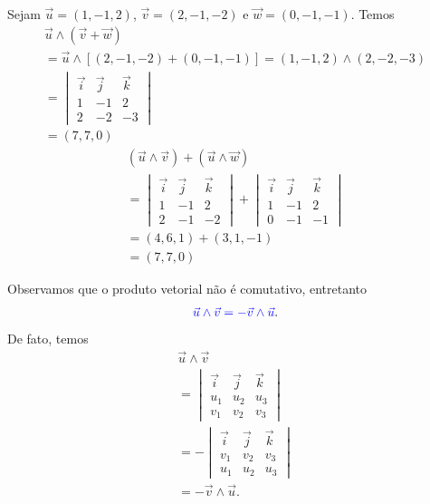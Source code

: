 \begin{ex}
  Sejam $\vec{u}=(1,-1,2)$, $\vec{v}=(2,-1,-2)$ e $\vec{w}=(0,-1,-1)$. Temos
  \begin{gather}
    \vec{u}\land(\vec{v}+\vec{w}) \\
    = \vec{u}\land \left[(2,-1,-2)+(0,-1,-1)\right]
    = (1,-1,2)\land (2,-2,-3) \\
    = \begin{vmatrix}
      \vec{i} & \vec{j} & \vec{k} \\
      1 & -1 & 2 \\
      2 & -2 & -3
    \end{vmatrix} \\
    = (7,7,0)  
  \end{gather}
  \begin{gather}
    (\vec{u}\land\vec{v}) + (\vec{u}\land\vec{w}) \\
        = \begin{vmatrix}
          \vec{i} & \vec{j} & \vec{k} \\
          1 & -1 & 2 \\
          2 & -1 & -2
        \end{vmatrix} + \begin{vmatrix}
          \vec{i} & \vec{j} & \vec{k} \\
          1 & -1 & 2 \\
          0 & -1 & -1
        \end{vmatrix} \\
        = (4,6,1) + (3,1,-1) \\
        = (7,7,0)
  \end{gather}
\end{ex}

Observamos que o {\color{blue}produto vetorial não é comutativo}, entretanto
\begin{equation}
  {\color{blue}\vec{u}\land\vec{v} = -\vec{v}\land\vec{u}}.
\end{equation}
De fato, temos
\begin{gather}
  \vec{u}\land\vec{v} \\
  = \begin{vmatrix}
    \vec{i} & \vec{j} & \vec{k} \\
    u_1 & u_2 & u_3 \\
    v_1 & v_2 & v_3                                    
  \end{vmatrix}\\
  = -\begin{vmatrix}
    \vec{i} & \vec{j} & \vec{k} \\
    v_1 & v_2 & v_3 \\
    u_1 & u_2 & u_3                                    
  \end{vmatrix}\\
  = -\vec{v}\land\vec{u}.
\end{gather}

